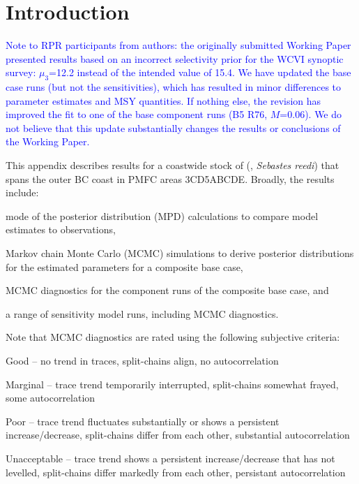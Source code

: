 \documentclass[11pt]{book}
\newcommand{\newstuff}[1]{\normalsize\textcolor{blue}{#1}\normalsize}
\begin{document}
\section{Introduction}

\newstuff{Note to RPR participants from authors: the originally submitted Working Paper presented results based on an incorrect selectivity prior for the WCVI synoptic survey: $\mu_3$=12.2 instead of the intended value of 15.4.
We have updated the base case runs (but not the sensitivities), which has resulted in minor differences to parameter estimates and MSY quantities.
If nothing else, the revision has improved the fit to one of the base component runs (B5 R76, $M$=0.06).
We do not believe that this update substantially changes the results or conclusions of the Working Paper.}

This appendix describes results for a coastwide stock of \SPP{} (\SPC, \emph{Sebastes reedi}) that spans the outer BC coast in PMFC areas 3CD5ABCDE.
Broadly, the results include:
\vspace{-0.5\baselineskip}%
\begin{itemize_csas}
\item mode of the posterior distribution (MPD) calculations to compare model estimates to observations, 
\item Markov chain Monte Carlo (MCMC) simulations to derive posterior distributions for the estimated parameters for a composite base case,
\item MCMC diagnostics for the component runs of the composite base case, and
\item a range of sensitivity model runs, including MCMC diagnostics.
\end{itemize_csas}
Note that MCMC diagnostics are rated using the following subjective criteria:
\begin{itemize_csas}
  \item Good -- no trend in traces, split-chains align, no autocorrelation
  \item Marginal -- trace trend temporarily interrupted, split-chains somewhat frayed, some autocorrelation
  \item Poor -- trace trend fluctuates substantially or shows a persistent increase/decrease, split-chains differ from each other, substantial autocorrelation
  \item Unacceptable -- trace trend shows a persistent increase/decrease that has not levelled, split-chains differ markedly from each other, persistant autocorrelation
\end{itemize_csas}
\end{document}
